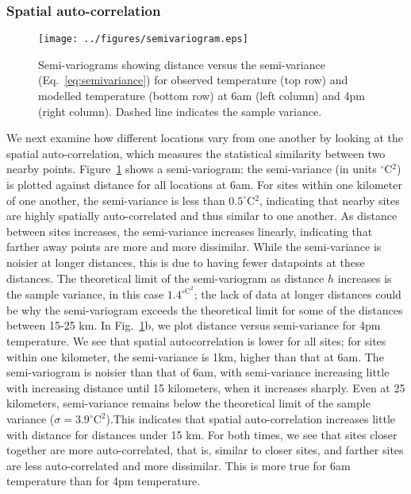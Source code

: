 \documentclass[draft,linenumbers]{agujournal}
\begin{document}
\subsubsection{Spatial auto-correlation}
\begin{figure}
\centering
\texttt{[image: ../figures/semivariogram.eps]}
\caption{Semi-variograms showing distance versus the semi-variance (Eq.~\ref{eq:semivariance}) for observed temperature (top row) and modelled temperature (bottom row) at 6am (left column) and 4pm (right column). Dashed line indicates the sample variance. 
}\label{fig:semiv_obs}
\end{figure}
We next examine how different locations vary from one another by looking at the spatial auto-correlation, which measures the statistical similarity between two nearby points. Figure~\ref{fig:semiv_obs} shows a semi-variogram: the semi-variance (in units $^\circ$C$^2$) is plotted against distance for all locations at 6am. For sites within one kilometer of one another, the semi-variance is less than $0.5^\circ$C$^2$, indicating that nearby sites are highly spatially auto-correlated and thus similar to one another. 
As distance between sites increases, the semi-variance increases linearly, indicating that farther away points are more and more dissimilar. While the semi-variance is noisier at longer distances, this is due to having fewer datapoints at these distances. 
The theoretical limit of the semi-variogram as distance $h$ increases is the sample variance, in this case $1.4^{\circ \text{C} ^2}$; the lack of data at longer distances could be why the semi-variogram exceeds the theoretical limit for some of the distances between 15-25 km. 
In Fig.~\ref{fig:semiv_obs}b, we plot distance versus semi-variance for 4pm temperature. We see that spatial autocorrelation is lower for all sites; for sites within one kilometer, the semi-variance is 1km, higher than that at 6am. The semi-variogram is noisier than that of 6am, with semi-variance increasing little with increasing distance until 15 kilometers, when it increases sharply. Even at 25 kilometers, semi-variance remains below the theoretical limit of the sample variance ($\sigma = 3.9^\circ \text{C}^2$).This indicates that spatial auto-correlation increases little with distance for distances under 15 km.
For both times, we see that sites closer together are more auto-correlated, that is, similar to closer sites, and farther sites are less auto-correlated and more dissimilar. This is more true for 6am temperature than for 4pm temperature. 
\end{document}
